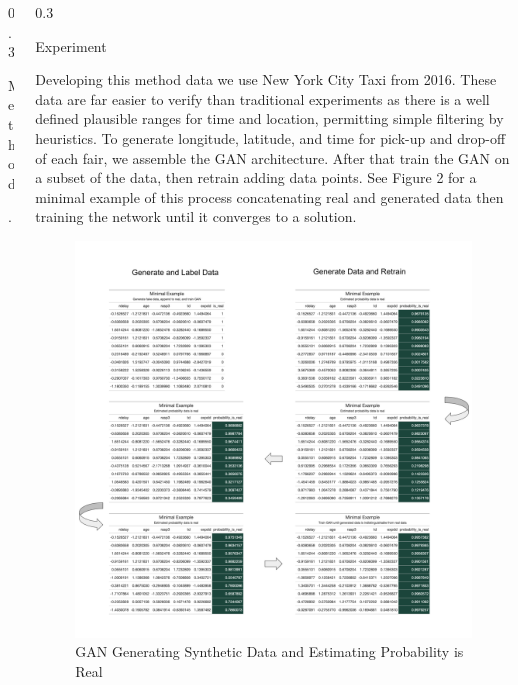 \documentclass{msuposter}
\newcommand{\colwidth}{0.3\linewidth}
\begin{document}
\begin{frame}{}
\begin{columns}[t]
\begin{column}{\colwidth}
\begin{block}{Method}
\newpage 

\end{block}. 


\end{column}


\begin{column}{\colwidth}

\begin{block}{Experiment}

Developing this method data we use New York City Taxi from 2016\cite{nyc2016}. These data are far easier to verify than traditional experiments as there is a well defined plausible ranges for time and location, permitting simple filtering by heuristics. To generate longitude, latitude, and time for pick-up and drop-off of each fair, we assemble the GAN architecture. After that train the GAN on a subset of the data, then retrain adding data points. See Figure 2 for a minimal example of this process concatenating real and generated data then training the network until it converges to a solution.


\begin{figure}
  \includegraphics[width=\linewidth]{gan_conv.png}
      	\caption{\label{fig:my-label} GAN Generating Synthetic Data and Estimating Probability is Real}
\end{figure}


\end{block}
\end{column}
\end{columns}
\end{frame}
\end{document}
